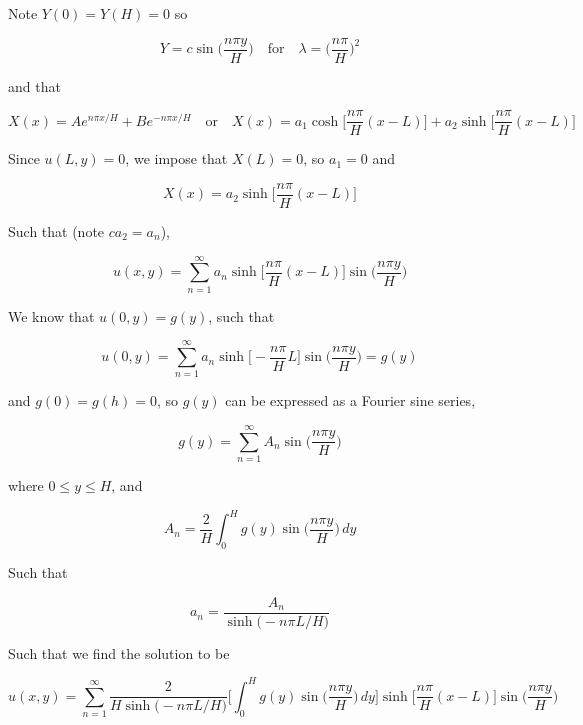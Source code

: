 \documentclass[a4paper]{article}
\begin{document}
Note $Y(0)=Y(H)=0$ so

\begin{equation*}
    Y=c\sin\bigg(\frac{n\pi y}{H}\bigg)\quad\text{for}\quad \lambda = \bigg(\frac{n\pi}{H}\bigg)^2
\end{equation*}

and that

\begin{equation*}
    X(x)=Ae^{n\pi x/H}+Be^{-n\pi x/H}\quad\text{or}\quad X(x)=a_1\cosh\bigg[\frac{n\pi}{H}(x-L)\bigg]+a_2\sinh\bigg[\frac{n\pi}{H}(x-L)\bigg]
\end{equation*}

Since $u(L, y)=0$, we impose that $X(L)=0$, so $a_1=0$ and

\begin{equation*}
     X(x)=a_2\sinh\bigg[\frac{n\pi}{H}(x-L)\bigg]
\end{equation*}

Such that (note $ca_2=a_n$),

\begin{equation*}
    u(x, y)=\sum_{n=1}^{\infty}a_n\sinh\bigg[\frac{n\pi}{H}(x-L)\bigg]\sin\bigg(\frac{n\pi y}{H}\bigg)
\end{equation*}

We know that $u(0, y)=g(y)$, such that

\begin{equation*}
    u(0, y)=\sum_{n=1}^{\infty}a_n\sinh\bigg[-\frac{n\pi}{H}L\bigg]\sin\bigg(\frac{n\pi y}{H}\bigg)=g(y)
\end{equation*}

and $g(0)=g(h)=0$, so $g(y)$ can be expressed as a Fourier sine series,

\begin{equation*}
    g(y)=\sum_{n=1}^{\infty}A_n\sin\bigg(\frac{n\pi y}{H}\bigg)
\end{equation*}

where $0\le y\le H$, and

\begin{equation*}
    A_n=\frac{2}{H}\int_0^H g(y)\sin\bigg(\frac{n\pi y}{H}\bigg)\,dy
\end{equation*}

Such that

\begin{equation*}
    a_n=\frac{A_n}{\sinh\big(-n\pi L/H\big)}
\end{equation*}

Such that we find the solution to be

\begin{equation*}
    u(x, y)=\sum_{n=1}^{\infty}\frac{2}{H\sinh\big(-n\pi L/H\big)}\bigg[\int_0^H g(y)\sin\bigg(\frac{n\pi y}{H}\bigg)\,dy\bigg]\sinh\bigg[\frac{n\pi}{H}(x-L)\bigg]\sin\bigg(\frac{n\pi y}{H}\bigg)
\end{equation*}
\end{document}
